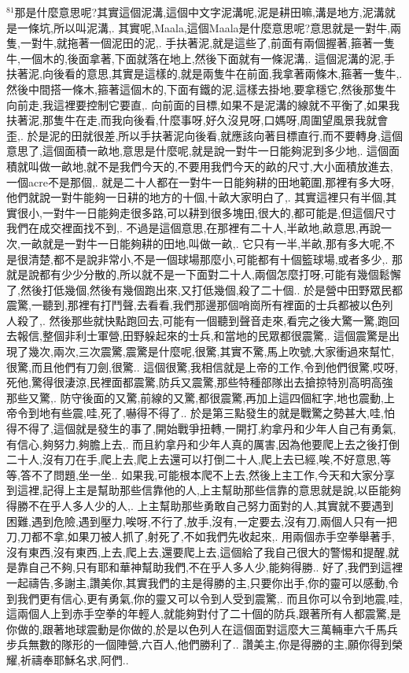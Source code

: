 \documentclass{book}
\begin{document}
$^{81}$那是什麼意思呢?其實這個泥溝,這個中文字泥溝呢,泥是耕田嘛,溝是地方,泥溝就是一條坑,所以叫泥溝,.
其實呢,Maala,這個Maala是什麼意思呢?意思就是一對牛,兩隻,一對牛,就拖著一個泥田的泥,.
手扶著泥,就是這些了,前面有兩個握著,箍著一隻牛,一個木的,後面拿著,下面就落在地上,然後下面就有一條泥溝,.
這個泥溝的泥,手扶著泥,向後看的意思,其實是這樣的,就是兩隻牛在前面,我拿著兩條木,箍著一隻牛,.
然後中間搭一條木,箍著這個木的,下面有鐵的泥,這樣去掛地,要拿穩它,然後那隻牛向前走,我這裡要控制它要直,.
向前面的目標,如果不是泥溝的線就不平衡了,如果我扶著泥,那隻牛在走,而我向後看,什麼事呀,好久沒見呀,口媽呀,周圍望風景我就會歪,.
於是泥的田就很差,所以手扶著泥向後看,就應該向著目標直行,而不要轉身,這個意思了,這個面積一畝地,意思是什麼呢,就是說一對牛一日能夠泥到多少地,.
這個面積就叫做一畝地,就不是我們今天的,不要用我們今天的畝的尺寸,大小面積放進去,一個acre不是那個,.
就是二十人都在一對牛一日能夠耕的田地範圍,那裡有多大呀,他們就說一對牛能夠一日耕的地方的十個,十畝大家明白了,.
其實這裡只有半個,其實很小,一對牛一日能夠走很多路,可以耕到很多塊田,很大的,都可能是,但這個尺寸我們在成交裡面找不到,.
不過是這個意思,在那裡有二十人,半畝地,畝意思,再說一次,一畝就是一對牛一日能夠耕的田地,叫做一畝,.
它只有一半,半畝,那有多大呢,不是很清楚,都不是說非常小,不是一個球場那麼小,可能都有十個籃球場,或者多少,.
那就是說都有少少分散的,所以就不是一下面對二十人,兩個怎麼打呀,可能有幾個鬆懈了,然後打低幾個,然後有幾個跑出來,又打低幾個,殺了二十個..
於是營中田野眾民都震驚,一聽到,那裡有打鬥聲,去看看,我們那邊那個哨崗所有裡面的士兵都被以色列人殺了,.
然後那些就快點跑回去,可能有一個聽到聲音走來,看完之後大驚一驚,跑回去報信,整個非利士軍營,田野躲起來的士兵,和當地的民眾都很震驚,.
這個震驚是出現了幾次,兩次,三次震驚,震驚是什麼呢,很驚,其實不驚,馬上吹號,大家衝過來幫忙,很驚,而且他們有刀劍,很驚..
這個很驚,我相信就是上帝的工作,令到他們很驚,哎呀,死他,驚得很淒涼,民裡面都震驚,防兵又震驚,那些特種部隊出去搶掠特別高明高強那些又驚,.
防守後面的又驚,前線的又驚,都很震驚,再加上這四個紅字,地也震動,上帝令到地有些震,哇,死了,嚇得不得了..
於是第三點發生的就是戰驚之勢甚大,哇,怕得不得了,這個就是發生的事了,開始戰爭扭轉,一開打,約拿丹和少年人自己有勇氣,有信心,夠努力,夠膽上去,.
而且約拿丹和少年人真的厲害,因為他要爬上去之後打倒二十人,沒有刀在手,爬上去,爬上去還可以打倒二十人,爬上去已經,唉,不好意思,等等,答不了問題,坐一坐..
如果我,可能根本爬不上去,然後上主工作,今天和大家分享到這裡,記得上主是幫助那些信靠他的人,上主幫助那些信靠的意思就是說,以臣能夠得勝不在乎人多人少的人,.
上主幫助那些勇敢自己努力面對的人,其實就不要遇到困難,遇到危險,遇到壓力,唉呀,不行了,放手,沒有,一定要去,沒有刀,兩個人只有一把刀,刀都不拿,如果刀被人抓了,射死了,不如我們先收起來,.
用兩個赤手空拳舉著手,沒有東西,沒有東西,上去,爬上去,還要爬上去,這個給了我自己很大的警惕和提醒,就是靠自己不夠,只有耶和華神幫助我們,不在乎人多人少,能夠得勝..
好了,我們到這裡一起禱告,多謝主,讚美你,其實我們的主是得勝的主,只要你出手,你的靈可以感動,令到我們更有信心,更有勇氣,你的靈又可以令到人受到震驚,.
而且你可以令到地震,哇,這兩個人上到赤手空拳的年輕人,就能夠對付了二十個的防兵,跟著所有人都震驚,是你做的,跟著地球震動是你做的,於是以色列人在這個面對這麼大三萬輛車六千馬兵步兵無數的隊形的一個陣營,六百人,他們勝利了..
讚美主,你是得勝的主,願你得到榮耀,祈禱奉耶穌名求,阿們..
\newpage
\end{document}
